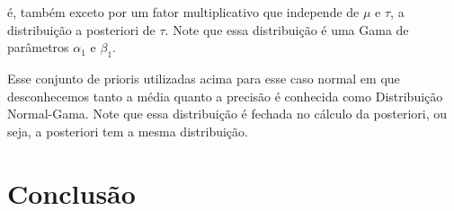\documentclass{article}
\begin{document}
\noindent é, também exceto por um fator multiplicativo que independe de $\mu$ e $\tau$, a distribuição a posteriori de $\tau$. Note que essa distribuição é uma Gama de parâmetros $\alpha_1$ e $\beta_1$.

Esse conjunto de prioris utilizadas acima para esse caso normal em que desconhecemos tanto a média quanto a precisão é conhecida como Distribuição Normal-Gama. Note que essa distribuição é fechada no cálculo da posteriori, ou seja, a posteriori tem a mesma distribuição.








\section*{Conclusão}



\printbibliography
\end{document}
